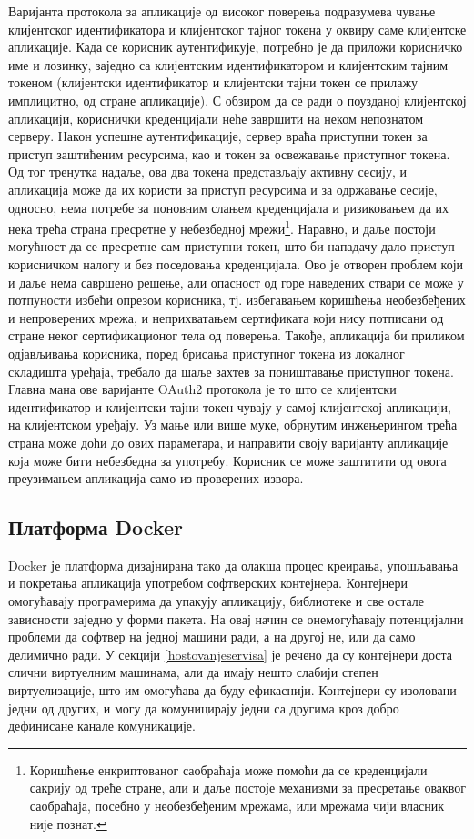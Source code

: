 \documentclass[12pt,oneside]{memoir}
\begin{document}
Варијанта протокола за апликације од високог поверења подразумева чување клијентског идентификатора и клијентског тајног токена у оквиру саме клијентске апликације. Када се корисник аутентификује, потребно је да приложи корисничко име и лозинку, заједно са клијентским идентификатором и клијентским тајним токеном (клијентски идентификатор и клијентски тајни токен се прилажу имплицитно, од стране апликације). С обзиром да се ради о поузданој клијентској апликацији, кориснички креденцијали неће завршити на неком непознатом серверу. Након успешне аутентификације, сервер враћа приступни токен за приступ заштићеним ресурсима, као и токен за освежавање приступног токена. Од тог тренутка надаље, ова два токена представљају активну сесију, и апликација може да их користи за приступ ресурсима и за одржавање сесије, односно, нема потребе за поновним слањем креденцијала и ризиковањем да их нека трећа страна пресретне у небезбедној мрежи\footnote{Коришћење енкриптованог саобраћаја може помоћи да се креденцијали сакрију од треће стране, али и даље постоје механизми за пресретање оваквог саобраћаја, посебно у необезбеђеним мрежама, или мрежама чији власник није познат.}. Наравно, и даље постоји могућност да се пресретне сам приступни токен, што би нападачу дало приступ корисничком налогу и без поседовања креденцијала. Ово је отворен проблем који и даље нема савршено решење, али опасност од горе наведених ствари се може у потпуности избећи опрезом корисника, тј. избегавањем коришћења необезбеђених и непроверених мрежа, и неприхватањем сертификата који нису потписани од стране неког сертификационог тела од поверења. Такође, апликација би приликом одјављивања корисника, поред брисања приступног токена из локалног складишта уређаја, требало да шаље захтев за поништавање приступног токена. Главна мана ове варијанте OAuth2 протокола је то што се клијентски идентификатор и клијентски тајни токен чувају у самој клијентској апликацији, на клијентском уређају. Уз мање или више муке, обрнутим инжењерингом трећа страна може доћи до ових параметара, и направити своју варијанту апликације која може бити небезбедна за употребу. Корисник се може заштитити од овога преузимањем апликација само из проверених извора.

\subsection{Платформа Docker}
Docker је платформа дизајнирана тако да олакша процес креирања, упошљавања и покретања апликација употребом софтверских контејнера. Контејнери омогућавају програмерима да упакују апликацију, библиотеке и све остале зависности заједно у форми пакета. На овај начин се онемогућавају потенцијални проблеми да софтвер на једној машини ради, а на другој не, или да само делимично ради. У секцији \ref{hostovanjeservisa} је речено да су контејнери доста слични виртуелним машинама, али да имају нешто слабији степен виртуелизације, што им омогућава да буду ефикаснији. Контејнери су изоловани једни од других, и могу да комуницирају једни са другима кроз добро дефинисане канале комуникације.
\end{document}
